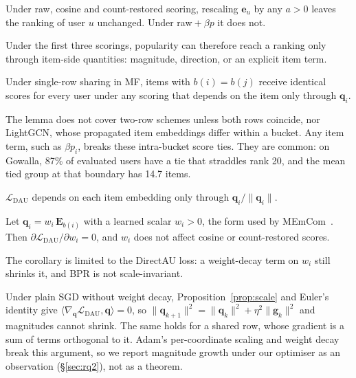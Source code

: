 \begin{lemma}\label{lem:user}
Under raw, cosine and count-restored scoring, rescaling $\mathbf{e}_u$ by any $a>0$ leaves the ranking of user $u$ unchanged. Under raw${}+\beta p$ it does not.
\end{lemma}
Under the first three scorings, popularity can therefore reach a ranking only through item-side quantities: magnitude, direction, or an explicit item term.

\begin{lemma}\label{lem:ties}
Under single-row sharing in MF, items with $b(i)=b(j)$ receive identical scores for every user under any scoring that depends on the item only through $\mathbf{q}_i$.
\end{lemma}
The lemma does not cover two-row schemes unless both rows coincide, nor LightGCN, whose propagated item embeddings differ within a bucket. Any item term, such as $\beta p_i$, breaks these intra-bucket score ties. They are common: on Gowalla, 87\% of evaluated users have a tie that straddles rank 20, and the mean tied group at that boundary has 14.7 items.

\begin{proposition}\label{prop:scale}
$\mathcal{L}_{\mathrm{DAU}}$ depends on each item embedding only through $\mathbf{q}_i/\|\mathbf{q}_i\|$.
\end{proposition}
\begin{corollary}\label{cor:scale}
Let $\mathbf{q}_i=w_i\,\mathbf{E}_{b(i)}$ with a learned scalar $w_i>0$, the form used by MEmCom~\cite{pansare2022memcom}. Then $\partial\mathcal{L}_{\mathrm{DAU}}/\partial w_i=0$, and $w_i$ does not affect cosine or count-restored scores.
\end{corollary}
The corollary is limited to the DirectAU loss: a weight-decay term on $w_i$ still shrinks it, and BPR is not scale-invariant.

\begin{remark}
Under plain SGD without weight decay, Proposition~\ref{prop:scale} and Euler's identity give $\langle\nabla_{\mathbf{q}}\mathcal{L}_{\mathrm{DAU}},\mathbf{q}\rangle=0$, so $\|\mathbf{q}_{k+1}\|^2=\|\mathbf{q}_k\|^2+\eta^2\|\mathbf{g}_k\|^2$ and magnitudes cannot shrink. The same holds for a shared row, whose gradient is a sum of terms orthogonal to it. Adam's per-coordinate scaling and weight decay break this argument, so we report magnitude growth under our optimiser as an observation (\S\ref{sec:rq2}), not as a theorem.
\end{remark}

